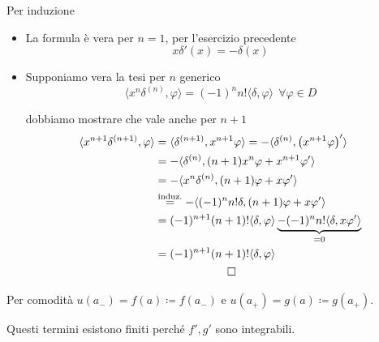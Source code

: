 Per induzione
\begin{itemize}
\item La formula è vera per $n = 1$, per l'esercizio precedente
\begin{equation*}
x\delta'(x) = - \delta (x)
\end{equation*}
\item Supponiamo vera la tesi per $n$ generico
\begin{equation*}
\langle x^{n} \delta^{(n)}, \varphi \rangle = (- 1)^{n} n!\langle \delta, \varphi \rangle \ \ \forall \varphi \in D
\end{equation*}

dobbiamo mostrare che vale anche per $n + 1$
\begin{gather*}
\begin{aligned}
\langle x^{n + 1} \delta^{(n + 1)}, \varphi \rangle & = \langle \delta^{(n + 1)}, x^{n + 1} \varphi \rangle = - \langle \delta^{(n)}, \left(x^{n + 1} \varphi \right)'\rangle \\
 & = - \langle \delta^{(n)}, (n + 1) x^{n} \varphi + x^{n + 1} \varphi'\rangle \\
 & = - \langle x^{n} \delta^{(n)}, (n + 1) \varphi + x\varphi'\rangle \\
 & \overset{\text{induz.}}{=} - \langle (- 1)^{n} n!\delta, (n + 1) \varphi + x\varphi'\rangle \\
 & = (- 1)^{n + 1}(n + 1) !\langle \delta, \varphi \rangle \underbrace{- (- 1)^{n} n!\langle \delta, x\varphi'\rangle}_{= 0}\\
 & = (- 1)^{n + 1}(n + 1) !\langle \delta, \varphi \rangle
\end{aligned}\\
\qed
\end{gather*}
\end{itemize}

\Soluzione

Per comodità $u(a_{-}) = f(a) \coloneqq f(a_{-})$ e $u(a_{+}) = g(a) \coloneqq g(a_{+})$.

Questi termini esistono finiti perché $f', g'$ sono integrabili.


